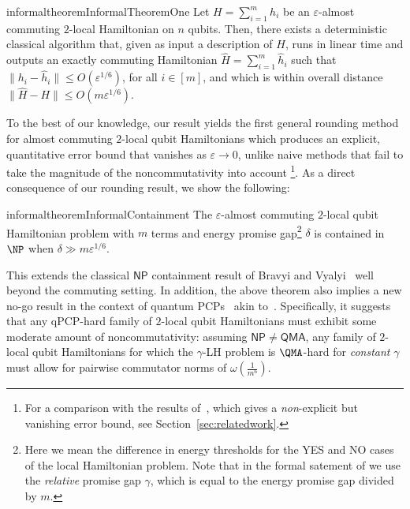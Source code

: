 \documentclass[11pt]{article}
\theoremstyle{plain}
\newcommand{\eps}{\varepsilon}
\begin{document}
\begin{restatable}{informaltheorem}{InformalTheoremOne}
Let $H=\sum_{i=1}^m h_i$ be an $\eps$-almost commuting $2$-local 
Hamiltonian on $n$ qubits. Then, there exists a deterministic classical algorithm that, given as input a description of $H$, runs 
in linear time and outputs an exactly commuting Hamiltonian $\hat{H}=\sum_{i=1}^m 
\hat{h}_i$ such that $\|h_i - \hat{h}_i\| \leq O(\eps^{1/6})$, for all 
$i \in [m]$, and which is within overall distance 
$\|\hat{H} - H\| \leq O(m \eps^{1/6})$.
\end{restatable}
To the best of our knowledge, our result yields the first general rounding method for almost commuting $2$-local qubit Hamiltonians which produces an explicit, quantitative error bound that vanishes as $\varepsilon \rightarrow 0$, unlike naive methods that fail to take the magnitude of the noncommutativity into account
\footnote{For a comparison with the results of~\cite{arad2011notepartialnogotheorem}, which gives a \emph{non}-explicit but vanishing error bound, see Section~\ref{sec:relatedwork}.}.
As a direct consequence of our rounding result, we show the following:



\begin{restatable}{informaltheorem}{InformalContainment}
    The $\eps$-almost commuting $2$-local qubit Hamiltonian problem with $m$ terms and energy promise gap\footnote{Here we mean the difference in energy thresholds for the YES and NO cases of the local Hamiltonian problem. Note that in the formal satement of  we use the \emph{relative} promise gap $\gamma$, which is equal to the energy promise gap divided by $m$.} $\delta$ is contained in $\NP$ when $\delta \gg m \eps^{1/6}$.
\end{restatable}
This extends the classical $\mathsf{NP}$ containment result of Bravyi and Vyalyi~\cite{bravyi2004commutativeversionklocalhamiltonian} well
beyond the commuting setting.
In addition, the above theorem also implies a new no-go result in the context of quantum PCPs~\cite{aharonov2011complexity,Hastings2012} akin to~\cite{arad2011notepartialnogotheorem}. Specifically, it suggests that any qPCP-hard family of $2$-local qubit Hamiltonians must exhibit some moderate amount of noncommutativity: assuming $\mathsf{NP} \neq \mathsf{QMA}$, any
family of $2$-local qubit Hamiltonians for which the $\gamma$-LH problem is $\QMA$-hard for \emph{constant} $\gamma$ must allow for pairwise commutator norms of $\omega(\frac{1}{m^6})$.
\end{document}
